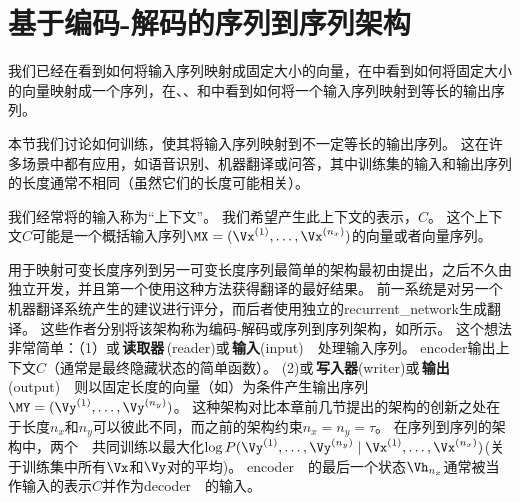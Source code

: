
\section{基于编码-解码的序列到序列架构}
\label{sec:encoder_decoder_sequence_to_sequence_architectures}
我们已经在看到如何将输入序列映射成固定大小的向量，在中看到如何将固定大小的向量映射成一个序列，在、、和中看到如何将一个输入序列映射到等长的输出序列。

本节我们讨论如何训练，使其将输入序列映射到不一定等长的输出序列。
这在许多场景中都有应用，如语音识别、机器翻译或问答，其中训练集的输入和输出序列的长度通常不相同（虽然它们的长度可能相关）。

我们经常将的输入称为``上下文''。
我们希望产生此上下文的表示，$C$。
这个上下文$C$可能是一个概括输入序列$\MX=(\Vx^{(1)},\dots,\Vx^{(n_x)})$的向量或者向量序列。

用于映射可变长度序列到另一可变长度序列最简单的架构最初由\cite{cho-al-emnlp14}提出，之后不久由\cite{Sutskever-et-al-NIPS2014}独立开发，并且第一个使用这种方法获得翻译的最好结果。
前一系统是对另一个机器翻译系统产生的建议进行评分，而后者使用独立的\gls{recurrent_network}生成翻译。
这些作者分别将该架构称为编码-解码或序列到序列架构，如所示。
这个想法非常简单：（1）或\,\textbf{读取器}\,(reader)或\,\textbf{输入}(input)~~处理输入序列。
\gls{encoder}输出上下文$C$（通常是最终隐藏状态的简单函数）。
(2)或\,\textbf{写入器}(writer)或\,\textbf{输出}(output)~~则以固定长度的向量（如）为条件产生输出序列$\MY=(\Vy^{(1)}, \dots, \Vy^{(n_y)})$。
这种架构对比本章前几节提出的架构的创新之处在于长度$n_x$和$n_y$可以彼此不同，而之前的架构约束$n_x = n_y = \tau$。
在序列到序列的架构中，两个~~共同训练以最大化$\log P( \Vy^{(1)}, \dots, \Vy^{(n_y)} \mid \Vx^{(1)},\dots,\Vx^{(n_x)} )$(关于训练集中所有$\Vx$和$\Vy$对的平均)。
\gls{encoder}~~的最后一个状态$\Vh_{n_x}$通常被当作输入的表示$C$并作为\gls{decoder}~~的输入。

